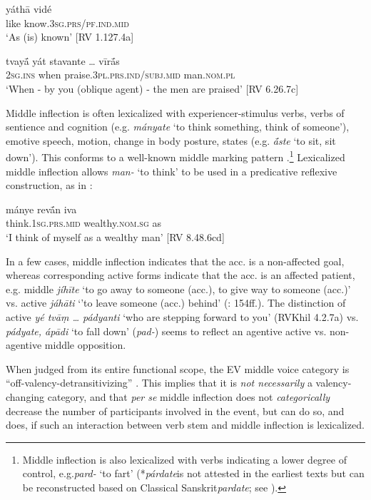 \documentclass[output=paper]{langscibook}
\begin{document}
\ea%
    \label{ex:Orqueda:6}
\gll yáthā  vidé\\
  like  know.\textsc{3sg.prs/pf.ind.mid}\\
\glt ‘As (is) known’ [RV 1.127.4a]
\z

\ea%
    \label{ex:Orqueda:7}
\gll tvay\'{ā}  yát  stavante …  vīr\'{ā}s\\
  2\textsc{sg.ins}  when  praise.\textsc{3pl.prs.ind/subj.mid} { } man.\textsc{nom.pl}\\
\glt ‘When - by you (oblique agent) - the men are praised’ [RV 6.26.7c]
\z

{Middle inflection is often lexicalized with experiencer-stimulus verbs, verbs of sentience and cognition (e.g. \textit{mányate} ‘to think something, think of someone’), emotive speech, motion, change in body posture, states (e.g. \textit{\'{ā}ste} ‘to sit, sit down’). This conforms to a well-known middle marking pattern \citep{Kemmer1993}.}\footnote{{{Middle inflection is also lexicalized with verbs indicating a lower degree of control, e.g.}{\textit{pard-} }{‘to fart’ (*}{\textit{pá}}{\textit{rdate}}{is not attested in the earliest texts but can be reconstructed based on Classical Sanskrit}{\textit{pardate}}{; see \citealt{Pooth2014}).}}}{ Lexicalized middle inflection allows \textit{man-} ‘to think’ to be used in a predicative reflexive construction, as in :}

\ea%
    \label{ex:Orqueda:8}
\gll mánye  rev\'{ā}n  iva\\
   think.\textsc{1sg.prs.mid}  wealthy.\textsc{nom.sg}  as\\
\glt ‘I think of myself as a wealthy man’ [RV 8.48.6cd]
\z

{In a few cases, middle inflection indicates that the acc. is a non-affected goal, whereas corresponding active forms indicate that the acc. is an affected patient, e.g. middle \textit{jíhīte} ‘to go away to someone (acc.), to give way to someone (acc.)’ vs. active \textit{jáhāti} ‘'to leave someone (acc.) behind’ (\citealt{Pooth2014}: 154ff.). The distinction of active \textit{yé tvāṃ … pádyanti} ‘who are stepping forward to you’ (RVKhil 4.2.7a) vs. \textit{pádyate, ápādi} ‘to fall down’ (\textit{pad-}) seems to reflect an agentive active vs. non-agentive middle opposition.}

{When judged from its entire functional scope, the EV middle voice category is “off-valency-detransitivizing” \citep{Pooth2014}. This implies that it is \textit{not necessarily} a valency-changing category, and that \textit{per se} middle inflection does not \textit{categorically} decrease the number of participants involved in the event, but can do so, and does, if such an interaction between verb stem and middle inflection is lexicalized.}
\end{document}
